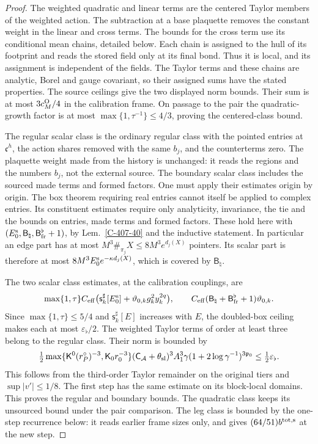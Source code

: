 \documentclass[11pt,letterpaper,reqno]{amsart}
\theoremstyle{definition}
\theoremstyle{remark}
\begin{document}
\begin{proof}
The weighted quadratic and linear terms are the centered
Taylor members of the weighted action. The subtraction at a
base plaquette removes the constant weight in the linear and
cross terms. The bounds for the cross term use its conditional
mean chains, detailed below. Each chain is assigned to the hull
of its footprint and reads the stored field only at its final
bond. Thus it is local, and its assignment is independent of
the fields. The Taylor terms and these chains are analytic,
Borel and gauge covariant, so their assigned sums have the
stated properties. The source ceilings give the two displayed
norm bounds. Their sum is at most $3c_M^{\rm O}/4$ in the
calibration frame. On passage to the pair the quadratic-growth
factor is at most $\max\{1,\tau^{-1}\}\le4/3$, proving the
centered-class bound.

The regular scalar class is the ordinary regular class with
the pointed entries at $\mathfrak c^h$, the action shares removed
with the same $b_j$, and the counterterms zero. The plaquette
weight made from the history is unchanged: it reads the regions
and the numbers $b_j$, not the external source. The boundary
scalar class includes the sourced made terms and formed factors.
One must apply their estimates origin by origin. The box theorem
requiring real entries cannot itself be applied to complex
entries. Its constituent estimates require only analyticity,
invariance, the tie and the bounds on entries, made terms and
formed factors. These hold here with
$(E_0^{\rm s},\mathsf B_\natural,\mathsf B_{\rm fr}^\flat+1)$,
by Lem.~\ref{C-407-40} and the inductive statement. In
particular an edge part has at most
$M^3\#_{\pi_j}X\le8M^3e^{d_j(X)}$ pointers. Its scalar part
is therefore at most $8M^3E_0^{\rm s}e^{-\kappa d_j(X)}$,
which is covered by $\mathsf B_\natural$.

The two scalar class estimates, at the calibration couplings,
are
\[
 \max\{1,\tau\}C_{\rm eff}
  \bigl(\mathsf s_k^\sharp[E_0^{\rm s}]
                   +\vartheta_{0,k}g_k^2y_k^{2q}\bigr),
 \qquad
 C_{\rm eff}(\mathsf B_\natural+
                     \mathsf B_{\rm fr}^\flat+1)\vartheta_{0,k}.
\]
Since $\max\{1,\tau\}\le5/4$ and
$\mathsf s_k^\sharp[E]$ increases with $E$, the doubled-box
ceiling makes each at most $\varepsilon_\flat/2$. The weighted
Taylor terms of order at least three belong to the regular
class. Their norm is bounded by
\[
 \tfrac12\max\{\mathsf K^0(r_P^\circ)^{-3},
                         \mathsf K_0r_0^{-3}\}
 (\mathsf C_{\mathcal A}+\theta_{\rm sl})^3 A_1^3
       \gamma(1+2\log\gamma^{-1})^{3\mathfrak p_0}
       \le\tfrac12\varepsilon_\flat.
\]
This follows from the third-order Taylor remainder on the
original tiers and $\sup|v'|\le1/8$. The first step has the
same estimate on its block-local domains. This proves the
regular and boundary bounds. The quadratic class keeps its
unsourced bound under the pair comparison. The leg class is
bounded by the one-step recurrence below: it reads earlier
frame sizes only, and gives $(64/51)b^{\rm tot,s}$ at the
new step.


\end{proof}
\end{document}
